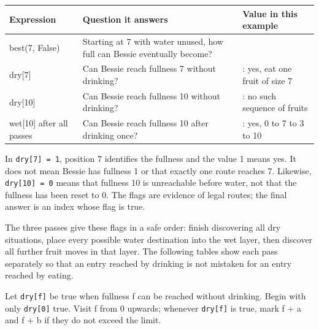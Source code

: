 \documentclass[11pt,a4paper,oneside]{report}
\begin{document}
\par\medskip\begingroup\small\setlength{\tabcolsep}{4pt}\renewcommand{\arraystretch}{1.3}\begin{tabularx}{\linewidth}{>{\raggedright\arraybackslash}X>{\raggedright\arraybackslash}X>{\raggedright\arraybackslash}X}\toprule\textbf{Expression} & \textbf{Question it answers} & \textbf{Value in this example}\\\midrule
{}best(7, False) & Starting at 7 with water unused, how full can Bessie eventually become? & 10\\
{}dry[7] & Can Bessie reach fullness 7 without drinking? & 1: yes, eat one fruit of size 7\\
{}dry[10] & Can Bessie reach fullness 10 without drinking? & 0: no such sequence of fruits\\
{}wet[10] after all passes & Can Bessie reach fullness 10 after drinking once? & 1: yes, 0 to 7 to 3 to 10\\
\bottomrule\end{tabularx}\endgroup\par\medskip
In \texttt{dry[7] = 1}, position 7 identifies the fullness and the value 1 means yes. It does not mean Bessie has fullness 1 or that exactly one route reaches 7. Likewise, \texttt{dry[10] = 0} means that fullness 10 is unreachable before water, not that the fullness has been reset to 0. The flags are evidence of legal routes; the final answer is an index whose flag is true.

The three passes give these flags in a safe order: finish discovering all dry situations, place every possible water destination into the wet layer, then discover all further fruit moves in that layer. The following tables show each pass separately so that an entry reached by drinking is not mistaken for an entry reached by eating.

Let \texttt{dry[f]} be true when fullness f can be reached without drinking. Begin with only \texttt{dry[0]} true. Visit f from 0 upwards; whenever \texttt{dry[f]} is true, mark f + a and f + b if they do not exceed the limit.
\end{document}
